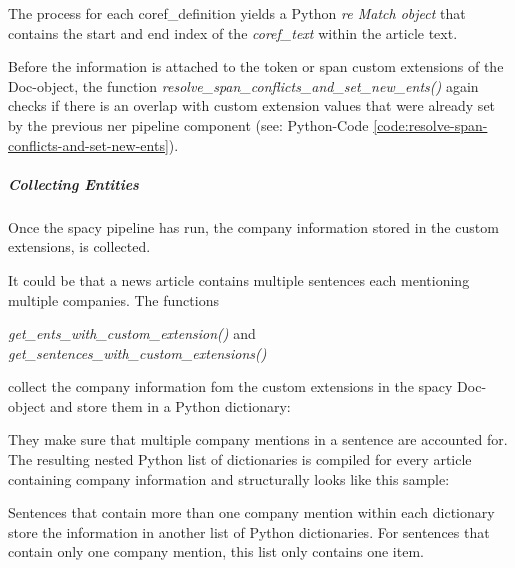 The process for each \gls{coref_definition} yields a Python \emph{re Match object} that contains the start and end index of the \emph{coref\_text} within the article text.

Before the information is attached to the \gls{token} or \gls{span} custom extensions of the Doc-object, the function \emph{resolve\_span\_conflicts\_and\_set\_new\_ents()} again checks if there is an overlap with custom extension values that were already set by the previous \gls{ner} pipeline component (see: Python-Code \ref{code:resolve-span-conflicts-and-set-new-ents}).

\subparagraph{Collecting Entities}
Once the spacy pipeline has run, the company information stored in the custom extensions, is collected.


It could be that a news article contains multiple sentences each mentioning multiple companies.
The functions
\begin{center}
    \emph{get\_ents\_with\_custom\_extension()} and \emph{get\_sentences\_with\_custom\_extensions()}
\end{center}
collect the company information fom the custom extensions in the spacy Doc-object and store them in a Python dictionary:


They make sure that multiple company mentions in a sentence are accounted for.
The resulting nested Python list of dictionaries is compiled for every article containing company information and structurally looks like this sample:


Sentences that contain more than one company mention within each dictionary store the information in another list of Python dictionaries.
For sentences that contain only one company mention, this list only contains one item.

